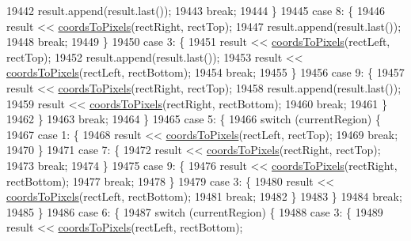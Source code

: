 \begin{DoxyCode}
19442       result.append(result.last());
19443       \textcolor{keywordflow}{break};
19444     \}
19445     \textcolor{keywordflow}{case} 8: \{
19446       result << \hyperlink{class_q_c_p_abstract_plottable_ade710a776104b14c1c835168ce1bfc5c}{coordsToPixels}(rectRight, rectTop);
19447       result.append(result.last());
19448       \textcolor{keywordflow}{break};
19449     \}
19450     \textcolor{keywordflow}{case} 3: \{
19451       result << \hyperlink{class_q_c_p_abstract_plottable_ade710a776104b14c1c835168ce1bfc5c}{coordsToPixels}(rectLeft, rectTop);
19452       result.append(result.last());
19453       result << \hyperlink{class_q_c_p_abstract_plottable_ade710a776104b14c1c835168ce1bfc5c}{coordsToPixels}(rectLeft, rectBottom);
19454       \textcolor{keywordflow}{break};
19455     \}
19456     \textcolor{keywordflow}{case} 9: \{
19457       result << \hyperlink{class_q_c_p_abstract_plottable_ade710a776104b14c1c835168ce1bfc5c}{coordsToPixels}(rectRight, rectTop);
19458       result.append(result.last());
19459       result << \hyperlink{class_q_c_p_abstract_plottable_ade710a776104b14c1c835168ce1bfc5c}{coordsToPixels}(rectRight, rectBottom);
19460       \textcolor{keywordflow}{break};
19461     \}
19462     \}
19463     \textcolor{keywordflow}{break};
19464   \}
19465   \textcolor{keywordflow}{case} 5: \{
19466     \textcolor{keywordflow}{switch} (currentRegion) \{
19467     \textcolor{keywordflow}{case} 1: \{
19468       result << \hyperlink{class_q_c_p_abstract_plottable_ade710a776104b14c1c835168ce1bfc5c}{coordsToPixels}(rectLeft, rectTop);
19469       \textcolor{keywordflow}{break};
19470     \}
19471     \textcolor{keywordflow}{case} 7: \{
19472       result << \hyperlink{class_q_c_p_abstract_plottable_ade710a776104b14c1c835168ce1bfc5c}{coordsToPixels}(rectRight, rectTop);
19473       \textcolor{keywordflow}{break};
19474     \}
19475     \textcolor{keywordflow}{case} 9: \{
19476       result << \hyperlink{class_q_c_p_abstract_plottable_ade710a776104b14c1c835168ce1bfc5c}{coordsToPixels}(rectRight, rectBottom);
19477       \textcolor{keywordflow}{break};
19478     \}
19479     \textcolor{keywordflow}{case} 3: \{
19480       result << \hyperlink{class_q_c_p_abstract_plottable_ade710a776104b14c1c835168ce1bfc5c}{coordsToPixels}(rectLeft, rectBottom);
19481       \textcolor{keywordflow}{break};
19482     \}
19483     \}
19484     \textcolor{keywordflow}{break};
19485   \}
19486   \textcolor{keywordflow}{case} 6: \{
19487     \textcolor{keywordflow}{switch} (currentRegion) \{
19488     \textcolor{keywordflow}{case} 3: \{
19489       result << \hyperlink{class_q_c_p_abstract_plottable_ade710a776104b14c1c835168ce1bfc5c}{coordsToPixels}(rectLeft, rectBottom);

\end{DoxyCode}
